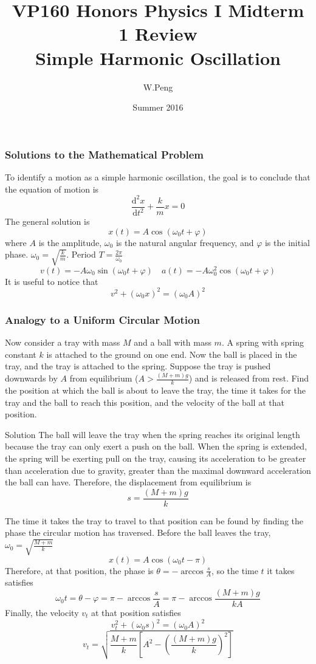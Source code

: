 \documentclass{beamer}
\title{VP160 Honors Physics I Midterm 1 Review\\Simple Harmonic Oscillation}
\author{W.Peng}
\institute{UM-SJTU JI}
\date{Summer 2016}
\begin{document}
\newcommand{\unit}[1]{\text{ }\mathrm{#1}}
\newcommand{\derivative}{\mathrm{d}}
\begin{frame}
\titlepage
\end{frame}
\begin{frame}
\frametitle{Solutions to the Mathematical Problem}
To identify a motion as a \alert{simple harmonic oscillation}, the goal is to conclude that the equation of motion is
\[\frac{\derivative^2 x}{\derivative t^2}+\frac{k}{m}x=0\]
The general solution is \[x(t)=A\cos(\omega_0 t+\varphi)\]
where $A$ is the amplitude, $\omega_0$ is the natural angular frequency, and $\varphi$ is the initial phase. $\omega_0=\sqrt{\frac{k}{m}}$. Period $T=\frac{2\pi}{\omega_0}$
\[v(t)=-A\omega_0\sin(\omega_0 t+\varphi)\quad a(t)=-A\omega_0^2\cos(\omega_0 t+\varphi)\]
It is useful to notice that \[v^2+(\omega_0 x)^2=(\omega_0 A)^2\]
\end{frame}
\begin{frame}
\frametitle{Analogy to a Uniform Circular Motion}
Now consider a tray with mass $M$ and a ball with mass $m$. A spring with spring constant $k$ is attached to the ground on one end. Now the ball is placed in the tray, and the tray is attached to the spring. Suppose the tray is pushed downwards by $A$ from equilibrium ($A>\frac{(M+m)g}{k}$) and is released from rest. Find the \alert{position} at which the ball is about to leave the tray, the \alert{time} it takes for the tray and the ball to reach this position, and the \alert{velocity} of the ball at that position.\\
\begin{block}{Solution}
The ball will leave the tray when the spring reaches its \alert{original length} because the tray can only exert a push on the ball. When the spring is extended, the spring will be exerting pull on the tray, causing its acceleration to be greater than \alert{acceleration due to gravity}, greater than the maximal downward acceleration the ball can have. Therefore, the displacement from equilibrium is
\[s=\frac{(M+m)g}{k}\]
\end{block}
\end{frame}
\begin{frame}
The time it takes the tray to travel to that position can be found by finding the \alert{phase} the circular motion has traversed. Before the ball leaves the tray, $\omega_0=\sqrt{\frac{M+m}{k}}$
\[x(t)=A\cos(\omega_0 t-\pi)\]
Therefore, at that position, the phase is $\theta=-\arccos\frac{s}{A}$, so the time $t$ it takes satisfies \[\omega_0 t=\theta-\varphi=\pi-\arccos\frac{s}{A}=\pi-\arccos\frac{(M+m)g}{kA}\]
Finally, the velocity $v_t$ at that position satisfies
\[v_t^2+(\omega_0 s)^2=(\omega_0 A)^2\]
\[v_t=\sqrt{\frac{M+m}{k}\left[A^2-\left(\frac{(M+m)g}{k}\right)^2\right]}\]
\end{frame}
\end{document}
